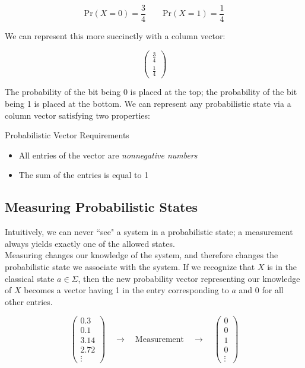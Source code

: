 \documentclass[svgnames]{article}     %
\begin{document}
\[
\text{Pr} (X = 0) = \frac{3}{4} \qquad \text{Pr} (X = 1) = \frac{1}{4} 
\] \vspace{5px}

We can represent this more succinctly with a column vector: 

\[
\begin{pmatrix}
  \frac{3}{4}\\[5px]
  \frac{1}{4}
\end{pmatrix}
\] \vspace{5px}

The probability of the bit being 0 is placed at the top; the probability of the bit being 1 is placed at the bottom. We can represent any probabilistic state via a column vector satisfying two properties: \\ 

\begin{mainbox}{Probabilistic Vector Requirements}
  \begin{itemize}
    \item[1.] All entries of the vector are \textit{nonnegative numbers}
    \item[2.] The sum of the entries is equal to 1
  \end{itemize}
\end{mainbox}

\subsection{Measuring Probabilistic States}

Intuitively, we can never ``see" a system in a probabilistic state; a measurement always yields exactly one of the allowed states. \\

Measuring changes our knowledge of the system, and therefore changes the probabilistic state we associate with the system. If we recognize that $X$ is in the classical state $a \in \Sigma$, then the new probability vector representing our knowledge of $X$ becomes a vector having 1 in the entry corresponding to $a$ and 0 for all other entries. 

\[
\begin{pmatrix}
  0.3 \\
  0.1 \\
  3.14 \\
  2.72 \\
  \vdots 
\end{pmatrix} 
\quad \rightarrow \quad \boxed{\text{Measurement}} \quad \rightarrow \quad
\begin{pmatrix}
  0 \\
  0 \\
  1 \\
  0 \\
  \vdots
\end{pmatrix}
\] \vspace{5px}
\end{document}
